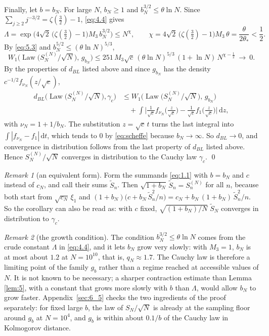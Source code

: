 \documentclass[aip,jmp,preprint,onecolumn,floatfix,superscriptaddress,nofootinbib,11pt]{revtex4-2}
\theoremstyle{plain}
\theoremstyle{remark}
\newtheorem*{remark}{Remark}
\numberwithin{equation}{section}
\newcommand{\dd}{\mathrm{d}}
\newcommand{\Law}{\operatorname{Law}}
\begin{document}
Finally, let $b=b_N$. For large $N$, $b_N\ge1$ and $b_N^{3/2}\le\theta\ln N$. Since $\sum_{j\ge2}j^{-3/2}=\zeta(\tfrac32)-1$, \eqref{eq:4.4} gives
%
\begin{equation*}
\Lambda=\exp\Big(4\sqrt2\,\big(\zeta(\tfrac32)-1\big)M_3\,b_N^{3/2}\Big)\le N^{\chi},\qquad \chi=4\sqrt2\,\big(\zeta(\tfrac32)-1\big)M_3\,\theta=\frac{\theta}{2\theta_*}<\frac12 .
\end{equation*}
%
By \eqref{eq:5.3} and $b_N^{5/2}\le(\theta\ln N)^{5/3}$,
%
\begin{equation*}
W_1\Big(\Law\big(S^{(N)}_N/\sqrt N\big),\,g_{b_N}\Big)\le251\,M_3\sqrt c\,(\theta\ln N)^{5/3}\,(1+\ln N)\,N^{\chi-\frac12}\ \longrightarrow\ 0 .
\end{equation*}
%
By the properties of $d_{BL}$ listed above and since $g_{b_N}$ has the density $c^{-1/2}f_{\nu_N}(z/\sqrt c)$,
%
\begin{equation*}
\begin{aligned} d_{BL}\Big(\Law\big(S^{(N)}_N/\sqrt N\big),\gamma_c\Big)&\le W_1\Big(\Law\big(S^{(N)}_N/\sqrt N\big),\,g_{b_N}\Big)\\[4pt] &\quad+\int\Big|\frac{1}{\sqrt c}f_{\nu_N}\Big(\frac{z}{\sqrt c}\Big)-\frac{1}{\sqrt c}f_1\Big(\frac{z}{\sqrt c}\Big)\Big|\,\dd z, \end{aligned}
\end{equation*}
%
with $\nu_N=1+1/b_N$. The substitution $z=\sqrt c\,t$ turns the last integral into $\int|f_{\nu_N}-f_1|\,\dd t$, which tends to $0$ by \eqref{eq:scheffe} because $b_N\to\infty$. So $d_{BL}\to0$, and convergence in distribution follows from the last property of $d_{BL}$ listed above. Hence $S^{(N)}_N/\sqrt N$ converges in distribution to the Cauchy law $\gamma_c$. \qed
 
\begin{remark}[an equivalent form]
Form the summands \eqref{eq:1.1} with $b=b_N$ and $c$ instead of $c_N$, and call their sums $\tilde S_n$. Then $\sqrt{1+b_N}\,\tilde S_n=S^{(N)}_n$ for all $n$, because both start from $\sqrt{c_N}\,\xi_1$ and $(1+b_N)\big(c+b_N\,\tilde S_n^{2}/n\big)=c_N+b_N\,(1+b_N)\,\tilde S_n^{2}/n$. So the corollary can also be read as: with $c$ fixed, $\sqrt{(1+b_N)/N}\;\tilde S_N$ converges in distribution to $\gamma_c$.
\end{remark}
 
\begin{remark}[the growth condition]
The condition $b_N^{3/2}\le\theta\ln N$ comes from the crude constant $\Lambda$ in \eqref{eq:4.4}, and it lets $b_N$ grow very slowly: with $M_3=1$, $b_N$ is at most about $1.2$ at $N=10^{10}$, that is, $q_N\approx1.7$. The Cauchy law is therefore a limiting point of the family $g_b$ rather than a regime reached at accessible values of $N$. It is not known to be necessary; a sharper contraction estimate than Lemma \ref{lem:5}, with a constant that grows more slowly with $b$ than $\Lambda$, would allow $b_N$ to grow faster. Appendix~\ref{sec:6_5} checks the two ingredients of the proof separately: for fixed large $b$, the law of $S_N/\sqrt N$ is already at the sampling floor around $g_b$ at $N=10^{4}$, and $g_b$ is within about $0.1/b$ of the Cauchy law in Kolmogorov distance.
\end{remark}
 
\end{document}
